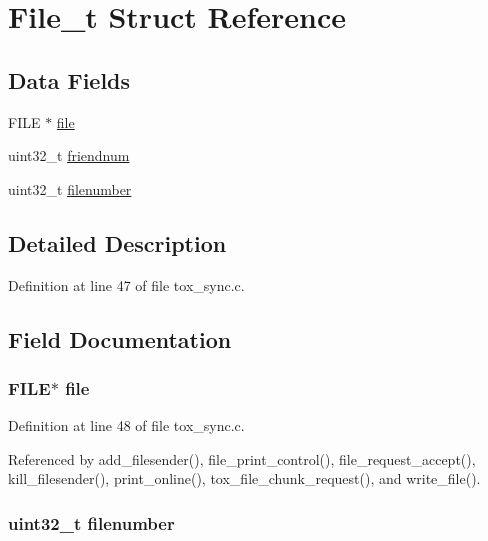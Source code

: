 \hypertarget{struct_file__t}{\section{File\+\_\+t Struct Reference}
\label{struct_file__t}
}
\subsection*{Data Fields}
\begin{DoxyCompactItemize}
\item 
F\+I\+L\+E $\ast$ \hyperlink{struct_file__t_a702945180aa732857b380a007a7e2a21}{file}
\item 
uint32\+\_\+t \hyperlink{struct_file__t_af02b3246ba69ea99fddd081f6e95598f}{friendnum}
\item 
uint32\+\_\+t \hyperlink{struct_file__t_a32e4dffe2d73a1eeddb1bc8ce5511367}{filenumber}
\end{DoxyCompactItemize}


\subsection{Detailed Description}


Definition at line 47 of file tox\+\_\+sync.\+c.



\subsection{Field Documentation}
\hypertarget{struct_file__t_a702945180aa732857b380a007a7e2a21}{
\subsubsection[{file}]{\setlength{\rightskip}{0pt plus 5cm}F\+I\+L\+E$\ast$ file}}\label{struct_file__t_a702945180aa732857b380a007a7e2a21}


Definition at line 48 of file tox\+\_\+sync.\+c.



Referenced by add\+\_\+filesender(), file\+\_\+print\+\_\+control(), file\+\_\+request\+\_\+accept(), kill\+\_\+filesender(), print\+\_\+online(), tox\+\_\+file\+\_\+chunk\+\_\+request(), and write\+\_\+file().

\hypertarget{struct_file__t_a32e4dffe2d73a1eeddb1bc8ce5511367}{
\subsubsection[{filenumber}]{\setlength{\rightskip}{0pt plus 5cm}uint32\+\_\+t filenumber}}\label{struct_file__t_a32e4dffe2d73a1eeddb1bc8ce5511367}


